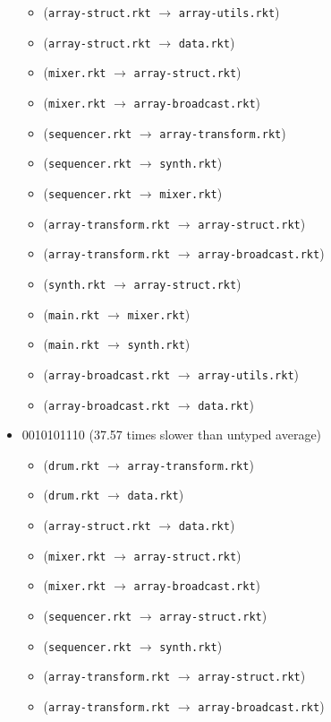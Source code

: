 \documentclass{article}
\newcommand{\mono}[1]{\texttt{#1}}
\begin{document}
\begin{itemize}
\begin{itemize}
  \item (\mono{array-struct.rkt} $\rightarrow$ \mono{array-utils.rkt})
  \item (\mono{array-struct.rkt} $\rightarrow$ \mono{data.rkt})
  \item (\mono{mixer.rkt} $\rightarrow$ \mono{array-struct.rkt})
  \item (\mono{mixer.rkt} $\rightarrow$ \mono{array-broadcast.rkt})
  \item (\mono{sequencer.rkt} $\rightarrow$ \mono{array-transform.rkt})
  \item (\mono{sequencer.rkt} $\rightarrow$ \mono{synth.rkt})
  \item (\mono{sequencer.rkt} $\rightarrow$ \mono{mixer.rkt})
  \item (\mono{array-transform.rkt} $\rightarrow$ \mono{array-struct.rkt})
  \item (\mono{array-transform.rkt} $\rightarrow$ \mono{array-broadcast.rkt})
  \item (\mono{synth.rkt} $\rightarrow$ \mono{array-struct.rkt})
  \item (\mono{main.rkt} $\rightarrow$ \mono{mixer.rkt})
  \item (\mono{main.rkt} $\rightarrow$ \mono{synth.rkt})
  \item (\mono{array-broadcast.rkt} $\rightarrow$ \mono{array-utils.rkt})
  \item (\mono{array-broadcast.rkt} $\rightarrow$ \mono{data.rkt})
  \end{itemize}
\item 0010101110 (37.57 times slower than untyped average)
  \begin{itemize}
  \item (\mono{drum.rkt} $\rightarrow$ \mono{array-transform.rkt})
  \item (\mono{drum.rkt} $\rightarrow$ \mono{data.rkt})
  \item (\mono{array-struct.rkt} $\rightarrow$ \mono{data.rkt})
  \item (\mono{mixer.rkt} $\rightarrow$ \mono{array-struct.rkt})
  \item (\mono{mixer.rkt} $\rightarrow$ \mono{array-broadcast.rkt})
  \item (\mono{sequencer.rkt} $\rightarrow$ \mono{array-struct.rkt})
  \item (\mono{sequencer.rkt} $\rightarrow$ \mono{synth.rkt})
  \item (\mono{array-transform.rkt} $\rightarrow$ \mono{array-struct.rkt})
  \item (\mono{array-transform.rkt} $\rightarrow$ \mono{array-broadcast.rkt})

\end{itemize}
\end{itemize}
\end{document}
